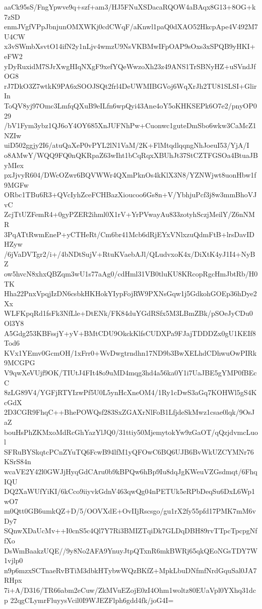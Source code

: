aaCk95sS/FngYpwve9q+szf+am3/HJ5FNuXSDacaRQOW4aBAqx8G13+8OG+k7zSD
enmJVgfVPpJbnjunOMXWKj0cdCWqF/aKnwl1paQ0dXAO52HkcpApe4V492M7U4CW
x3vSWmbXsvtO14ifN2y1nLjv4wmzU9NsVKBMwIFpOAP9sOxs3xSPQB9yHKI+eFW2
yDyRuxidM7SJrXwgHIqNXgF9xefYQeWwzoXh23z49ANS1TrSBNyHZ+uSVndJfOG8
rJ7DkO3Z7wtkK9PA6xSOOJSQt2frl4DeUWMIBGVoj6WqXrJh2TU81SLSI+GlirIn
ToQV8yj97Omc3LmfqQXuB9eILfn6wpQyi43Ane4oY5oKHKSEPk6O7e2/pnyOP029
/bV1Fym3ybz1QJ6oY4OY685XnJUFNhPw+Cuonwc1guteDmSbo6wkw3CaMcZ1NZIw
uiD502ggjy2I6/atuQaXeP0vPYL2lN1VaM/2K+FlMtqdlqqngNhJoeuI53/YjA/I
o8AMwY/WQQ9FQ0nQKRpaZ63wIht1bCqRqxXBUhJt37StCZTFGSOa4BtuaJByMIex
pxJjvyR604/DWcOZwr6BQVWWr4QXmPknOs4kKlX3N8/YZNWjwt8uonHbw1f9MGFw
ORbc1TBu6R3+QVcIyhZceFCHBazXioucoo6Gs8n+V/YbhjuPcf3j8w3mmBhoVJvC
ZcjTtUZFemR4+0gyPZER2ihml0X1rV+YrPVwayAu833zotyhSczjMeilY/Z6nNMR
3PqATtRwmEneP+yCTHeRt/Cm6br41Mcb6dRjEYxVNlxzuQdmFtB+lrsDavIDHZyw
/6jVaDVTgr2/i+/4bNDtSujV+RtuKVaebAJl/QLudvxoK4x/DiXtK4yJ1I4+NyBZ
ow5hvcN8xhxQBZqm3wU1s77aAg0/cdHml31VB0tluKU8KRcopRgcHmJbtRb/H0TK
Hha22PnxVpqjIzDN6csbkHKHokYIypFojRW9PXNsGqw1j5GdkohGOEp36hDye2Xx
WLFKpqRd1fsFk3NfLle+DtENk/FK84duYGdRSfx5M3LBmZBk/pSOeJyCDu0Ol3Y8
A5Gdg253KBFssjY+yV+BMtCDU9OkckKlfsCUDXPa9FJajTDDDZx0gU1KEIf8Tod6
KVx1YEmv0GcmOH/1xFrr0+WvDwgtrndhn17ND9b3BwXELhdCDhwuOwPIRk9MCGPG
V9qwXeVUjf9OK/TIUtJ4FIt48o9uMD4mqg3hd4a56ka0Y1i7UaJBE5gYMP0fBEcC
8zLG89V4/YGFjRTYIzwPf5U0L5ynHcXneOM4/1Ry1cDwS3aGq7KOHWl5gS4KcGdX
2D3CGR9FhqC++BhePOWQsf283SxZGAXrNlFoB1LfjdeSkMwz1csae0lqk/9OsJaZ
bouHsPhZKMxoMdRcGhYazYlJQ0/31ttiy50MjemytokYw9zGaOT/qQzjdvmcLuol
SFRuBYSkqtcPCnZYuTQ6FcwB94lfM1yQFOwC6BQ6UJB6BvWkUZCYMNr76KSrS84n
wcaVE2Y42l0GWJjHyqGdCAru0b9kBPQw6hBp9Iu8dqJgKWeuVZGsdmqt/6FhqIQU
DQ2XaWUfYiKI/6kCco9iiyvkGdnV463qwQg04nPETUk5eRPbDeqSu6DxL6Wp1wO7
m0Qtt0GB6umkQZ+D/5/OOVXdE+OvIIjRscsgo/gu1rX2fy55pfd17PMK7mM6vDy7
SQnwXDaUcMv++I0cnS5c4Ql7Y7Ri3BMIZTqiDk7GLDqDBH89rvTTpcTpcpgNffXo
DsWmBaakzUQE//9y8No2AFA9YnuyJtpQTxnR6mkBWRj65qkQEoNGsTDY7W1vjlp0
n9p6mzxSCTnaeRvBTiM3dbkHTybwWQzBKfZ+MpkLbuDNfmfNrdGquSal0JA7RHpx
7i+A/D316/TR66abm2eCuw/ZkMVuEZojE0zI4Ohm1woltz80EUaVpl0YXhq31dcp
22qgCLymrFluyysVcil0I9WJEZFlph6gdd4fk/joG4I=
